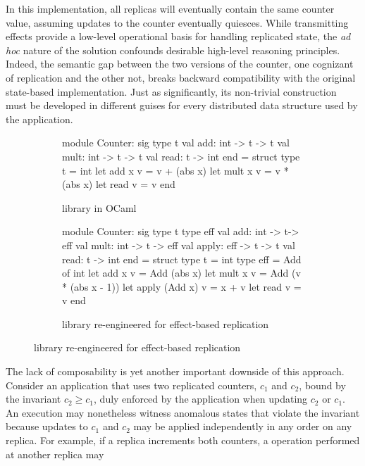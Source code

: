 In this implementation, all replicas will eventually contain the same
counter value, assuming updates to the counter eventually quiesces.
While transmitting effects provide a low-level operational basis for
handling replicated state, the \emph{ad hoc} nature of the solution
confounds desirable high-level reasoning principles.  Indeed, the
semantic gap between the two versions of the counter, one cognizant of
replication and the other not, breaks backward compatibility with the
original state-based implementation.  Just as significantly, its
non-trivial construction must be developed in different guises for
every distributed data structure used by the application.
\begin{figure}
\begin{subfigure}[b]{0.4\textwidth}
  \begin{ocaml}
    module Counter: sig
      type t
      val add: int -> t -> t
      val mult: int -> t -> t
      val read: t -> int
    end = struct
      type t = int
      let add x v = v + (abs x)
      let mult x v = v * (abs x)
      let read v = v
    end
  \end{ocaml}
\caption{ library in OCaml}
\label{fig:counter-adt}
\end{subfigure}
\begin{subfigure}[b]{0.56\textwidth}
  \begin{ocaml}
    module Counter: sig
      type t
      type eff
      val add: int -> t-> eff
      val mult: int -> t -> eff
      val apply: eff -> t -> t
      val read: t -> int
    end = struct
      type t = int
      type eff = Add of int
      let add x v = Add (abs x)
      let mult x v = Add (v * (abs x - 1))
      let apply (Add x) v = x + v
      let read v = v
    end
  \end{ocaml}
\caption{ library re-engineered for effect-based replication}
\label{fig:counter-rdt}
\end{subfigure}
\end{figure}
The lack of composability is yet another important downside of this
approach.  Consider an application that uses two replicated counters,
$c_1$ and $c_2$, bound by the invariant $c_2 \ge c_1$, duly enforced
by the application when updating $c_2$ or $c_1$.  An execution may
nonetheless witness anomalous states that violate the invariant
because updates to $c_1$ and $c_2$ may be applied independently in any
order on any replica.  For example, if a replica increments both
counters, a  operation performed at another replica may
